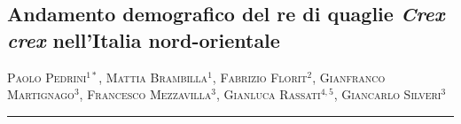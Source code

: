 \setcounter{figure}{0}
\setcounter{table}{0}

\begin{adjustwidth}{-3.5cm}{-1cm}
\pagestyle{CIOpage}
\chapter*[Il re di quaglie in Italia nord-orientale]{Andamento demografico del re di quaglie \textbf{\textit{Crex crex}}\textbf{ nell{\textquoteright}Italia nord-orientale}}

\textsc{Paolo Pedrini}$^{1*}$, \textsc{Mattia Brambilla}$^{1}$, 
\textsc{Fabrizio Florit}$^{2}$, \textsc{Gianfranco Martignago}$^{3}$, 
\textsc{Francesco Mezzavilla}$^{3}$, \textsc{Gianluca Rassati}$^{4,5}$, 
\textsc{Giancarlo Silveri}$^{3}$\\

      
\noindent\color{MUSEBLUE}\rule{27cm}{2pt}
\vspace{1cm}
\end{adjustwidth}



